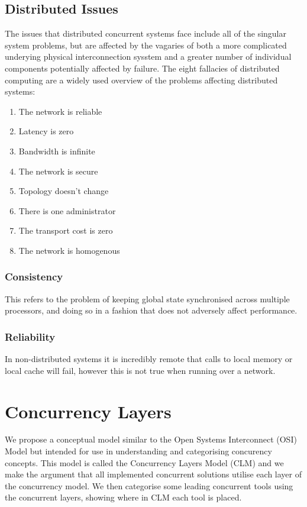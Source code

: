 \documentclass{sig-alternate}
\begin{document}
\subsection{Distributed Issues}
The issues that distributed concurrent systems face include all of the singular system problems, but are affected by the vagaries of both a more complicated underying physical interconnection sysstem and a greater number of individual components potentially affected by failure. The eight fallacies of distributed computing are a widely used overview of the problems affecting distributed systems:

\begin{enumerate}
\item The network is reliable
\item Latency is zero
\item Bandwidth is infinite
\item The network is secure
\item Topology doesn't change
\item There is one administrator
\item The transport cost is zero
\item The network is homogenous
\end{enumerate}

\subsubsection{Consistency}
This refers to the problem of keeping global state synchronised across multiple processors, and doing so in a fashion that does not adversely affect performance.

\subsubsection{Reliability}
In non-distributed systems it is incredibly remote that calls to local memory or local cache will fail, however this is not true when running over a network. 

\section{Concurrency Layers}
We propose a conceptual model similar to the Open Systems Interconnect (OSI) Model but intended for use in understanding and categorising concurency concepts. This model is called the Concurrency Layers Model (CLM) and we make the argument that all implemented concurrent solutions utilise each layer of the concurrency model. We then categorise some leading concurrent tools using the concurrent layers, showing where in CLM each tool is placed.
\end{document}

